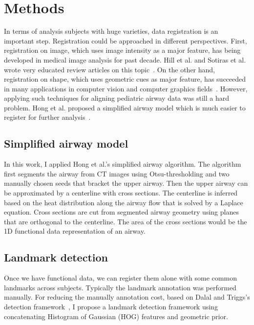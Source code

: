 \documentclass{llncs}
\begin{document}
\section{Methods}
\label{sec:methods}
In terms of analysis subjects with huge varieties, data registration is an important step.
Registration could be approached in different perspectives.
First, registration on image, which uses image intensity as a major feature, has being developed in medical image analysis for past decade. 
Hill et al. and Sotiras et al. wrote very educated review articles on this topic~\cite{hill2001medical,otiras2013deformable}.
On the other hand, registration on shape, which uses geometric cues as major feature, has succeeded in many applications in computer vision and computer graphics fields~\cite{belongie2002shape,li2012temporally}.
However, applying such techniques for aligning pediatric airway data was still a hard problem.
Hong et al. proposed a simplified airway model which is much easier to register for further analysis~\cite{hong2014statistical}.

\subsection{Simplified airway model}
\label{sec:simplified_airway_model}
In this work, I applied Hong et al.'s simplified airway algorithm.
The algorithm first segments the airway from CT images using Otsu-thresholding and two manually chosen seeds that bracket the upper airway.
Then the upper airway can be approximated by a centerline with cross sections.
The centerline is inferred based on the heat distribution along the airway flow that is solved by a Laplace equation.
Cross sections are cut from segmented airway geometry using planes that are orthogonal to the centerline. 
The area of the cross sections would be the 1D functional data representation of an airway.

\subsection{Landmark detection}
\label{sec:landmark_detection}
Once we have functional data, we can register them alone with some common landmarks across subjects.
Typically the landmark annotation was performed manually.
For reducing the manually annotation cost, based on Dalal and Triggs's  detection framework~\cite{dalal2005histograms}, I propose a landmark detection framework using concatenating Histogram of Gaussian (HOG) features and geometric prior.
\end{document}
